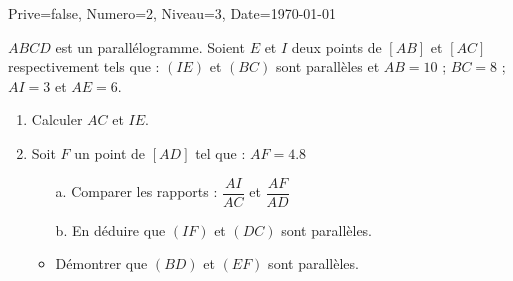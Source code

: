 \documentclass[a4paper,12pt]{article}
\begin{document}
\begin{Maquette}[DM]{Prive=false, Numero=2, Niveau=3, Date=\today}
\begin{exercice}
$ABCD$ est un parallélogramme. Soient $E$ et $I$ deux points de $[AB]$ et $[AC]$ respectivement tels que : $(IE)$ et $(BC)$ sont parallèles et $AB=10$ ; $BC=8$ ; $AI=3$ et $AE=6$.
\begin{enumerate}
\item Calculer $AC$ et $IE$.
\item Soit $F$ un point de $[AD]$ tel que : $AF=4.8$
\begin{itemize}
\item[a.]Comparer les rapports : $\dfrac{AI}{AC}$ et $\dfrac{AF}{AD}$
\item[b.]En déduire que $(IF)$ et $(DC)$ sont parallèles.
\item Démontrer que $(BD)$ et $(EF)$ sont parallèles.
\end{itemize}
\end{enumerate} 
\end{exercice}
\end{Maquette}
\end{document}

